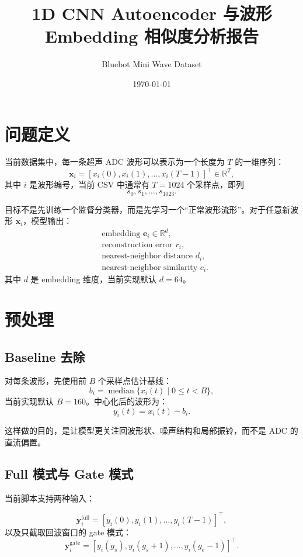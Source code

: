 \documentclass[UTF8,fontset=fandol]{ctexart}
\title{1D CNN Autoencoder 与波形 Embedding 相似度分析报告}
\author{Bluebot Mini Wave Dataset}
\date{\today}
\begin{document}
\maketitle

\section{问题定义}

当前数据集中，每一条超声 ADC 波形可以表示为一个长度为 $T$ 的一维序列：
\[
  \bm{x}_i = [x_i(0), x_i(1), \ldots, x_i(T-1)]^\top \in \mathbb{R}^{T},
\]
其中 $i$ 是波形编号，当前 CSV 中通常有 $T=1024$ 个采样点，即列
\[
  s_0, s_1, \ldots, s_{1023}.
\]

目标不是先训练一个监督分类器，而是先学习一个``正常波形流形''。对于任意新波形 $\bm{x}_i$，模型输出：
\[
  \begin{aligned}
    &\text{embedding } \bm{e}_i \in \mathbb{R}^{d},\\
    &\text{reconstruction error } r_i,\\
    &\text{nearest-neighbor distance } d_i,\\
    &\text{nearest-neighbor similarity } c_i.
  \end{aligned}
\]
其中 $d$ 是 embedding 维度，当前实现默认 $d=64$。

\section{预处理}

\subsection{Baseline 去除}

对每条波形，先使用前 $B$ 个采样点估计基线：
\[
  b_i = \operatorname{median}\{x_i(t) \mid 0 \le t < B\},
\]
当前实现默认 $B=160$。中心化后的波形为：
\[
  y_i(t) = x_i(t) - b_i.
\]

这样做的目的，是让模型更关注回波形状、噪声结构和局部振铃，而不是 ADC 的直流偏置。

\subsection{Full 模式与 Gate 模式}

当前脚本支持两种输入：

\[
  \bm{y}_i^{\text{full}}
  =
  [y_i(0), y_i(1), \ldots, y_i(T-1)]^\top,
\]
以及只截取回波窗口的 gate 模式：
\[
  \bm{y}_i^{\text{gate}}
  =
  [y_i(g_s), y_i(g_s+1), \ldots, y_i(g_e-1)]^\top.
\]
\end{document}
